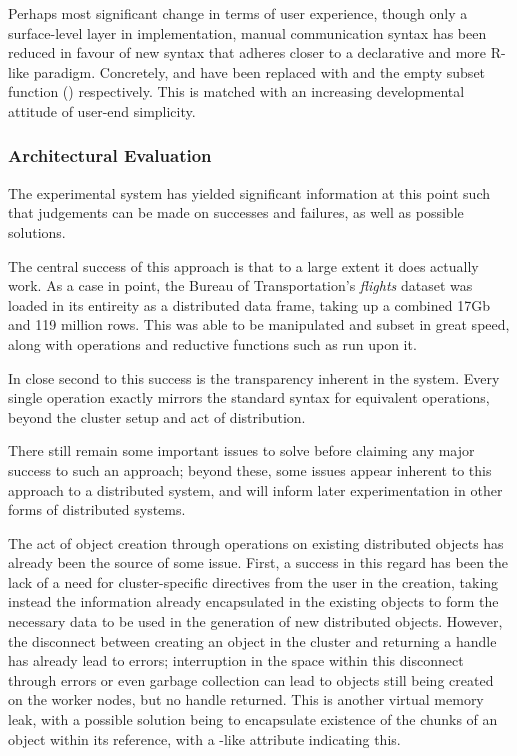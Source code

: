 Perhaps most significant change in terms of user experience, though only
a surface-level layer in implementation, manual communication syntax has
been reduced in favour of new syntax that adheres closer to a
declarative and more R-like paradigm. Concretely,  and
 have been replaced with  and the
empty subset function () respectively. This is matched
with an increasing developmental attitude of user-end simplicity.

\subsubsection{Architectural Evaluation}\label{sec:eval}

The experimental system has yielded significant information at this
point such that judgements can be made on successes and failures, as
well as possible solutions.

The central success of this approach is that to a large extent it does
actually work. As a case in point, the Bureau of Transportation's
\emph{flights} \cite{bot2009flights} dataset was loaded in its entireity
as a distributed data frame, taking up a combined 17Gb and 119 million
rows. This was able to be manipulated and subset in great speed, along
with operations and reductive functions such as  run upon
it.

In close second to this success is the transparency inherent in the
system. Every single operation exactly mirrors the standard \R{} syntax for
equivalent operations, beyond the cluster setup and act of distribution.

There still remain some important issues to solve before claiming any
major success to such an approach; beyond these, some issues appear
inherent to this approach to a distributed system, and will inform later
experimentation in other forms of distributed systems.

The act of object creation through operations on existing distributed
objects has already been the source of some issue. First, a success in
this regard has been the lack of a need for cluster-specific directives
from the user in the creation, taking instead the information already
encapsulated in the existing objects to form the necessary data to be
used in the generation of new distributed objects. However, the
disconnect between creating an object in the cluster and returning a
handle has already lead to errors; interruption in the space within this
disconnect through errors or even garbage collection can lead to objects
still being created on the worker nodes, but no handle returned. This is
another virtual memory leak, with a possible solution being to
encapsulate existence of the chunks of an object within its reference,
with a -like  attribute indicating this.

